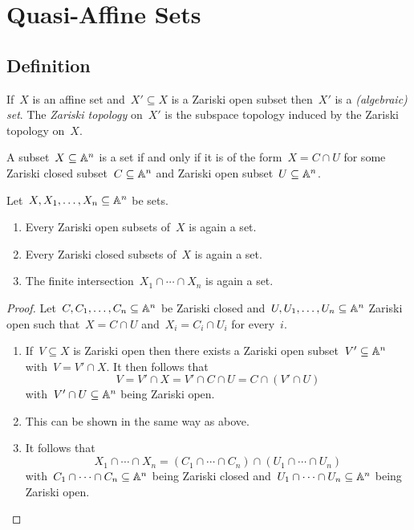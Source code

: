 \section{Quasi-Affine Sets}





\subsection{Definition}


\begin{definition}
  If~$X$ is an affine set and~$X' \subseteq X$ is a Zariski open subset then~$X'$ is a \emph{{\qaffine} \textup(algebraic\textup) set}.
  The \emph{Zariski topology} on~$X'$ is the subspace topology induced by the Zariski topology on~$X$.
\end{definition}


\begin{remark}
  A subset~$X \subseteq \mathbb{A}^n$ is a {\qaffine} set if and only if it is of the form~$X = C \cap U$ for some Zariski closed subset~$C \subseteq \mathbb{A}^n$ and Zariski open subset~$U \subseteq \mathbb{A}^n$.
\end{remark}


\begin{corollary}
  Let~$X, X_1, \dotsc, X_n \subseteq \mathbb{A}^n$ be {\qaffine} sets.
  \begin{enumerate}
    \item
      Every Zariski open subsets of~$X$ is again a {\qaffine} set.
    \item
      Every Zariski closed subsets of~$X$ is again a {\qaffine} set.
    \item
      The finite intersection~$X_1 \cap \dotsb \cap X_n$ is again a {\qaffine} set.
  \end{enumerate}
\end{corollary}


\begin{proof}
  Let~$C, C_1, \dotsc, C_n \subseteq \mathbb{A}^n$ be Zariski closed and~$U, U_1, \dotsc, U_n \subseteq \mathbb{A}^n$ Zariski open such that~$X = C \cap U$ and~$X_i = C_i \cap U_i$ for every~$i$.
  \begin{enumerate}
    \item
      If~$V \subseteq X$ is Zariski open then there exists a Zariski open subset~$V' \subseteq \mathbb{A}^n$ with~$V = V' \cap X$.
      It then follows that
      \[
          V
        = V' \cap X
        = V' \cap C \cap U
        = C \cap (V' \cap U)
      \]
      with~$V' \cap U \subseteq \mathbb{A}^n$ being Zariski open.
    \item
      This can be shown in the same way as above.
    \item
      It follows that
      \[
          X_1 \cap \dotsb \cap X_n
        = (C_1 \cap \dotsb \cap C_n) \cap (U_1 \cap \dotsb \cap U_n)
      \]
      with~$C_1 \cap \dotsb \cap C_n \subseteq \mathbb{A}^n$ being Zariski closed and~$U_1 \cap \dotsb \cap U_n \subseteq \mathbb{A}^n$ being Zariski open.
    \qedhere
  \end{enumerate}
\end{proof}


